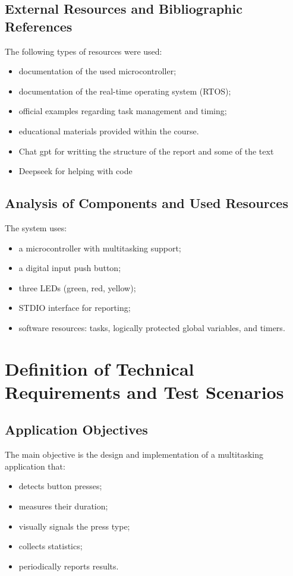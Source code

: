 \documentclass[12pt,a4paper]{article}
\begin{document}
\subsection{External Resources and Bibliographic References}
The following types of resources were used:
\begin{itemize}
    \item documentation of the used microcontroller;
    \item documentation of the real-time operating system (RTOS);
    \item official examples regarding task management and timing;
    \item educational materials provided within the course.
    	\item Chat gpt for writting the structure of the report and some of the text
	\item Deepseek for helping with code
\end{itemize}


\subsection{Analysis of Components and Used Resources}
The system uses:
\begin{itemize}
    \item a microcontroller with multitasking support;
    \item a digital input push button;
    \item three LEDs (green, red, yellow);
    \item STDIO interface for reporting;
    \item software resources: tasks, logically protected global variables, and timers.
\end{itemize}

\section{Definition of Technical Requirements and Test Scenarios}

\subsection{Application Objectives}
The main objective is the design and implementation of a multitasking application that:
\begin{itemize}
    \item detects button presses;
    \item measures their duration;
    \item visually signals the press type;
    \item collects statistics;
    \item periodically reports results.
\end{itemize}
\end{document}
